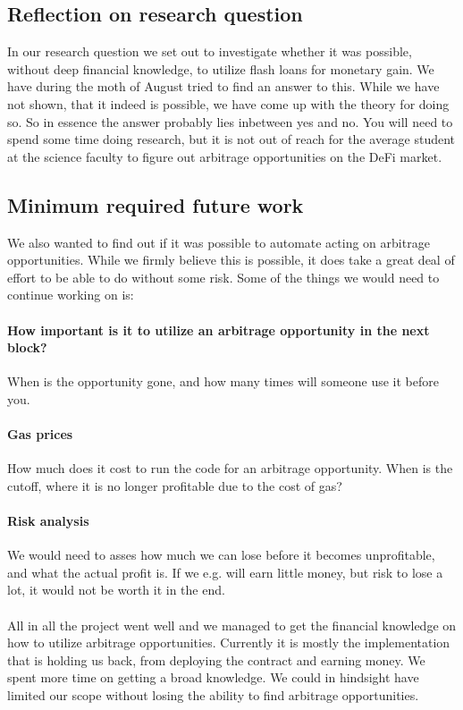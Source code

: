 \subsection{Reflection on research question}
In our research question we set out to investigate whether it was possible,
without deep financial knowledge, to utilize flash loans for monetary gain. We
have during the moth of August tried to find an answer to this. While we have
not shown, that it indeed is possible, we have come up with the theory for doing
so. So in essence the answer probably lies inbetween yes and no. You will need
to spend some time doing research, but it is not out of reach for the average
student at the science faculty to figure out arbitrage opportunities on the DeFi
market.

\subsection{Minimum required future work}
\noindent We also wanted to find out if it was possible to automate acting on
arbitrage opportunities. While we firmly believe this is possible, it does take
a great deal of effort to be able to do without some risk. Some of the things
we would need to continue working on is:

\paragraph{How important is it to utilize an arbitrage opportunity in the next
block?} When is the opportunity gone, and how many times will someone use it
before you.
\paragraph{Gas prices} How much does it cost to run the code for an arbitrage
opportunity. When is the cutoff, where it is no longer profitable due to the
cost of gas?
\paragraph{Risk analysis} We would need to asses how much we can lose before it
becomes unprofitable, and what the actual profit is. If we e.g. will earn little
money, but risk to lose a lot, it would not be worth it in the end.\\\\
All in all the project went well and we managed to get the financial knowledge
on how to utilize arbitrage opportunities. Currently it is mostly the
implementation that is holding us back, from deploying the contract and earning
money. We spent more time on getting a broad knowledge. We could in hindsight
have limited our scope without losing the ability to find arbitrage
opportunities.

